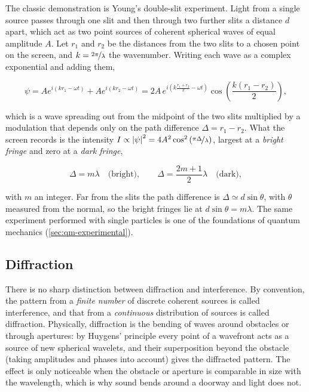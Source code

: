         The classic demonstration is Young's double-slit experiment. Light from a single source passes through one slit and then through two further slits a distance $d$ apart, which act as two point sources of coherent spherical waves of equal amplitude $A$. Let $r_{1}$ and $r_{2}$ be the distances from the two slits to a chosen point on the screen, and $k=\nicefrac{2\pi}{\lambda}$ the wavenumber. Writing each wave as a complex exponential and adding them,

        \begin{equation*}
            \psi = A e^{i\left(kr_{1}-\omega t\right)} + A e^{i\left(kr_{2}-\omega t\right)} = 2A\,e^{i\left(k\frac{r_{1}+r_{2}}{2}-\omega t\right)}\cos\left(\frac{k\left(r_{1}-r_{2}\right)}{2}\right),
        \end{equation*}

        which is a wave spreading out from the midpoint of the two slits multiplied by a modulation that depends only on the path difference $\Delta = r_{1}-r_{2}$. What the screen records is the intensity $I \propto \left|\psi\right|^{2} = 4A^{2}\cos^{2}\left(\nicefrac{\pi\Delta}{\lambda}\right)$, largest at a \emph{bright fringe} and zero at a \emph{dark fringe},

        \begin{equation*}
            \Delta = m\lambda \quad \text{(bright)}, \qquad \Delta = \frac{2m+1}{2}\lambda \quad \text{(dark)},
        \end{equation*}

        with $m$ an integer. Far from the slits the path difference is $\Delta \simeq d\sin\theta$, with $\theta$ measured from the normal, so the bright fringes lie at $d\sin\theta = m\lambda$. The same experiment performed with single particles is one of the foundations of quantum mechanics (\cref{sec:qm-experimental}).

    \subsection{Diffraction}

        There is no sharp distinction between diffraction and interference. By convention, the pattern from a \emph{finite number} of discrete coherent sources is called interference, and that from a \emph{continuous} distribution of sources is called diffraction. Physically, diffraction is the bending of waves around obstacles or through apertures: by Huygens' principle every point of a wavefront acts as a source of new spherical wavelets, and their superposition beyond the obstacle (taking amplitudes and phases into account) gives the diffracted pattern. The effect is only noticeable when the obstacle or aperture is comparable in size with the wavelength, which is why sound bends around a doorway and light does not.

